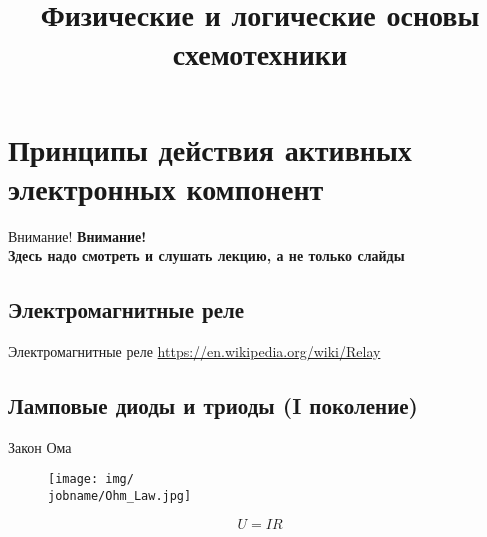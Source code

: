 \documentclass[xetex,aspectratio=43]{beamer}
\title[Основы схемотехники]{Физические и логические основы схемотехники}
\begin{document}
    \titleslide

    \tocslide


\section{Принципы действия активных электронных компонент}

\begin{frame}{Внимание!}
    \textbf{\alert{Внимание!\\
            Здесь надо смотреть и слушать лекцию, а не только слайды}}
\end{frame}

\subsection{Электромагнитные реле}

\begin{frame}{Электромагнитные реле}
    \url{https://en.wikipedia.org/wiki/Relay}
\end{frame}

\subsection{Ламповые диоды и триоды (I поколение)}

\begin{frame}{Закон Ома}
    \begin{figure}
        \texttt{[image: img/\\jobname/Ohm\_Law.jpg]}
    \end{figure}
    $$U = IR$$
\end{frame}
\end{document}
